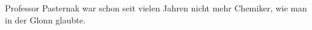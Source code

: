 

Professor Pasternak war schon seit vielen Jahren nicht mehr
Chemiker, wie man in der Glonn glaubte.